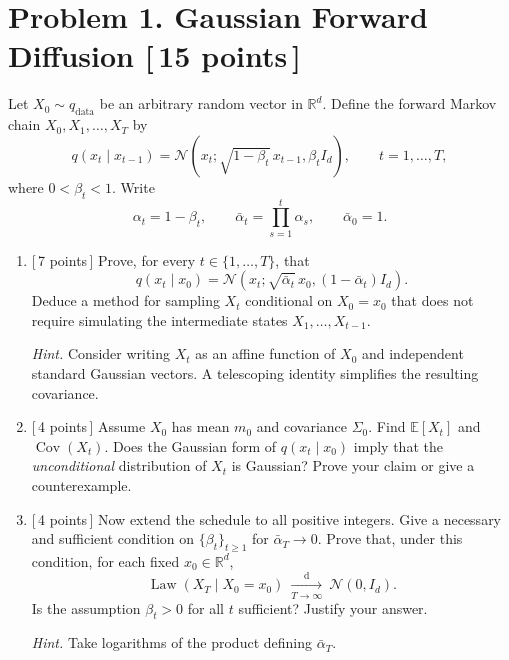 \documentclass[11pt]{article}
\newcommand{\R}{\mathbb{R}}
\newcommand{\E}{\mathbb{E}}
\newcommand{\N}{\mathcal{N}}
\newcommand{\Cov}{\operatorname{Cov}}
\newcommand{\Law}{\operatorname{Law}}
\newcommand{\hint}[1]{\par\vspace{2pt}\noindent\textit{Hint.} #1\par}
\newcommand{\pts}[1]{\hfill\textnormal{[\,#1 points\,]}}
\begin{document}
\newpage
\section*{Problem 1. Gaussian Forward Diffusion \pts{15}}

Let \(X_0\sim q_{\mathrm{data}}\) be an arbitrary random vector in \(\R^d\). Define the
forward Markov chain \(X_0,X_1,\ldots,X_T\) by
\begin{equation}\label{eq:forward}
  q(x_t\mid x_{t-1})
  =\N\!\left(x_t;\sqrt{1-\beta_t}\,x_{t-1},\beta_t I_d\right),
  \qquad t=1,\ldots,T,
\end{equation}
where \(0<\beta_t<1\). Write
\[
  \alpha_t=1-\beta_t,\qquad
  \bar\alpha_t=\prod_{s=1}^t\alpha_s,\qquad
  \bar\alpha_0=1.
\]

\begin{enumerate}
  \item \pts{7} Prove, for every \(t\in\{1,\ldots,T\}\), that
  \begin{equation}\label{eq:forward-marginal}
    q(x_t\mid x_0)
    =\N\!\left(x_t;\sqrt{\bar\alpha_t}\,x_0,
                      (1-\bar\alpha_t)I_d\right).
  \end{equation}
  Deduce a method for sampling \(X_t\) conditional on \(X_0=x_0\) that does not require
  simulating the intermediate states \(X_1,\ldots,X_{t-1}\).

  \hint{Consider writing \(X_t\) as an affine function of \(X_0\) and independent standard
  Gaussian vectors. A telescoping identity simplifies the resulting covariance.}

  \item \pts{4} Assume \(X_0\) has mean \(m_0\) and covariance \(\Sigma_0\).
  Find \(\E[X_t]\) and \(\Cov(X_t)\). Does the Gaussian form of
  \(q(x_t\mid x_0)\) imply that the \emph{unconditional} distribution of \(X_t\) is
  Gaussian? Prove your claim or give a counterexample.

  \item \pts{4} Now extend the schedule to all positive integers. Give a necessary and
  sufficient condition on \(\{\beta_t\}_{t\ge1}\) for \(\bar\alpha_T\to0\).
  Prove that, under this condition, for each fixed \(x_0\in\R^d\),
  \[
    \Law(X_T\mid X_0=x_0)\ \xrightarrow[T\to\infty]{\mathrm{d}}\ \N(0,I_d).
  \]
  Is the assumption \(\beta_t>0\) for all \(t\) sufficient? Justify your answer.

  \hint{Take logarithms of the product defining \(\bar\alpha_T\).}
\end{enumerate}
\end{document}
